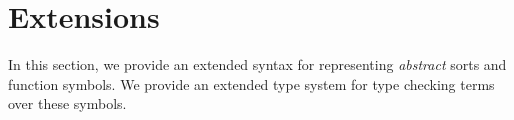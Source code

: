 \documentclass[english,a4paper,10pt]{article}
\begin{document}
\begin{comment}
In detail,
let $\{ t_1, \ldots, t_n \}$ be a partition of table $t$
where for each table $t_i$, each of its (tuple) elements
are identical for arguments $n_1, \ldots, n_k$.
For each $i = 1, \ldots, n$,
let $M_i$ be the bag $p(t_i)$
where $p$ is the projection operator denoted by $\syntax{(\_\ project\ n)}$.
For each such bag $M_i = \{ u_{i1}, \ldots, u_{in} \}$,
assume an arbitrary ordering over these elements $\preceq$.
Let $r_i$ be the term:
\begin{align*}
f( M_i, c( u_{in}, \ldots, c( u_{i1}, b ) \ldots ) )
\end{align*}
where $u_{i1} \preceq \ldots \preceq u_{in}$.
In other words,
$r_i$ is the result of a fold operation
starting with \emph{initial value} $b$,
applying \emph{combining function} $c$ to
the accumulated value and each of the tuples $u_{i1}, \ldots, u_{in}$,
and finally applying a \emph{finalization} function $f$
to the bag $M_i$ and to the result of the aforementioned computation.
Then,
$A( t, b, c, f)$ is
the bag union of (single argument) tuples $\{ (r_1), \ldots, (r_n) \}$.

\paragraph{Unspecified Finalize Function}
We overload the aggregation function
such that its fourth argument is optional.
If the fourth argument is not specified,
then 
$
\syntax{
((\_\ aggr\ n_1\ ...\ n_k\ n)\ t\ b\ c)
}
$
is syntax sugar for
$
\syntax{
((\_\ aggr\ n_1\ ...\ n_k\ n)\ t\ b\ c\ ident)
}
$
where $\syntax{ident}$ is the function
$\syntax{(lambda\ ((y\ (Table\ T_1 ...\ T_k))\ (x\ X_a))\ x)}$.
In other words, this function returns the result of the
fold computation described above unchanged.
\end{comment}

\section{Extensions}

In this section, we provide an extended syntax for representing
\emph{abstract} sorts and function symbols.
We provide an extended type system for type checking terms over these symbols.
\end{document}
